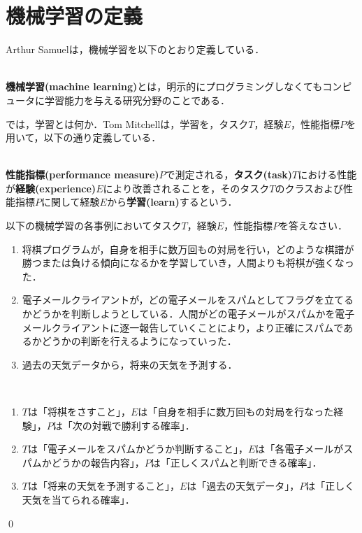 \section{機械学習の定義}

Arthur Samuelは，機械学習を以下のとおり定義している．
\begin{defi}
　\\
{\bf 機械学習(machine learning)}とは，明示的にプログラミングしなくてもコンピュータに学習能力を与える研究分野のことである．
\end{defi}

では，学習とは何か．Tom Mitchellは，学習を，タスク$T$，経験$E$，性能指標$P$を用いて，以下の通り定義している．
\begin{defi}
　\\
{\bf 性能指標(performance measure)}$P$で測定される，{\bf タスク(task)}$T$における性能が{\bf 経験(experience)}$E$により改善されることを，そのタスク$T$のクラスおよび性能指標$P$に関して経験$E$から{\bf 学習(learn)}するという．
\end{defi}

\begin{qu}
以下の機械学習の各事例においてタスク$T$，経験$E$，性能指標$P$を答えなさい．
\begin{enumerate}
	\item 将棋プログラムが，自身を相手に数万回もの対局を行い，どのような棋譜が勝つまたは負ける傾向になるかを学習していき，人間よりも将棋が強くなった．
	\item 電子メールクライアントが，どの電子メールをスパムとしてフラグを立てるかどうかを判断しようとしている．人間がどの電子メールがスパムかを電子メールクライアントに逐一報告していくことにより，より正確にスパムであるかどうかの判断を行えるようになっていった．
	\item 過去の天気データから，将来の天気を予測する．
\end{enumerate}	
\end{qu}
\begin{ans}　
\begin{enumerate}
	\item $T$は「将棋をさすこと」，$E$は「自身を相手に数万回もの対局を行なった経験」，$P$は「次の対戦で勝利する確率」．
	\item $T$は「電子メールをスパムかどうか判断すること」，$E$は「各電子メールがスパムかどうかの報告内容」，$P$は「正しくスパムと判断できる確率」．
	\item $T$は「将来の天気を予測すること」，$E$は「過去の天気データ」，$P$は「正しく天気を当てられる確率」．
\end{enumerate}
\qed
\end{ans}

